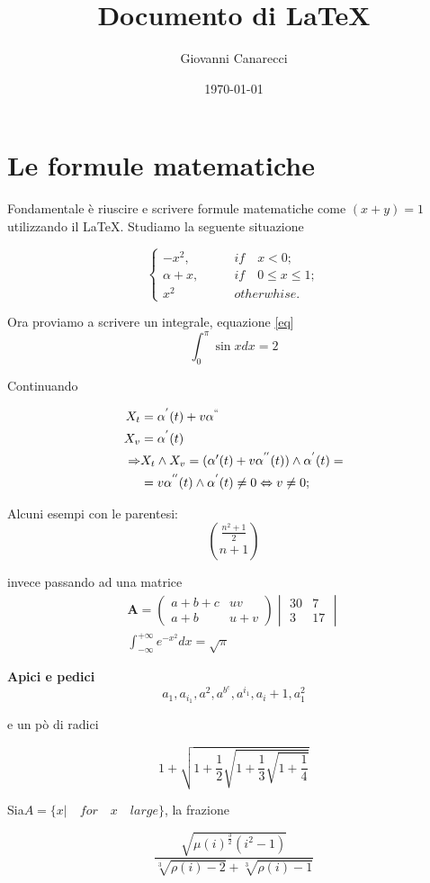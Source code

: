\documentclass[a4paper,10pt]{article}
\title{Documento di \LaTeX}
\author{Giovanni Canarecci}
\date{\today}
\begin{document}
\maketitle
\section{\textbf{Le formule matematiche}}
Fondamentale è riuscire e scrivere formule matematiche come $(x+y) = 1$ utilizzando il \LaTeX. 
Studiamo la seguente situazione

 $$
\begin{cases}
-x^2,\qquad &if\quad x<0;\\
\alpha + x,\qquad &if\quad0\leq x\leq1;\\
x^2\qquad &otherwhise.
\end{cases}
 $$

\noindent
Ora proviamo a scrivere un integrale, equazione \eqref{eq}\\

\begin{equation}
\label{eq}
\int_{0}^{\pi}\sin xdx = 2
 \end{equation}

Continuando

\begin{align*}
 X_t&=\alpha^{'}(t)+v\alpha^{``}\\
 X_v&=\alpha^{'}(t)\\
\Rightarrow &X_{t}\wedge X_{v}=(\alpha{'}(t)+v\alpha^{''}(t))\wedge\alpha^{'}(t)=\\
&=v\alpha^{''}(t)\wedge \alpha^{'}(t)\neq 0 \Leftrightarrow v\neq 0;
\end{align*}

Alcuni esempi con le parentesi:
$$
\binom{\frac{n^{2}+1}{2}}{n+1}
$$

invece passando ad una matrice
\begin{align*}
\mathbf{A}=\begin{pmatrix}
            a+b+c&uv\\
            a+b&u+v
           \end{pmatrix}
\begin{vmatrix}
 30&7\\
 3&17
\end{vmatrix}
\\
\int_{-\infty}^{+\infty}e^{-x^{2}}dx= \sqrt{\pi}
\end{align*}

\textbf{Apici e pedici}
$$
a_1,a_{i_{1}},a^2,a^{b^{c}},a^{i_{1}},a_{i}+1,a_1^2
$$

e un pò di radici

$$
1+\sqrt{1+\frac{1}{2}\sqrt{1+\frac{1}{3}\sqrt{1+\frac{1}{4}}}}
$$

Sia$ A=\{x \lvert \quad for\quad x \quad large\}$, la frazione

$$
\frac{\sqrt{\mu(i)^{\frac{3}{2}}(i^{2}-1)}}{\sqrt[3]{\rho(i)-2}+\sqrt[3]{\rho(i)-1}}
$$
\end{document}
